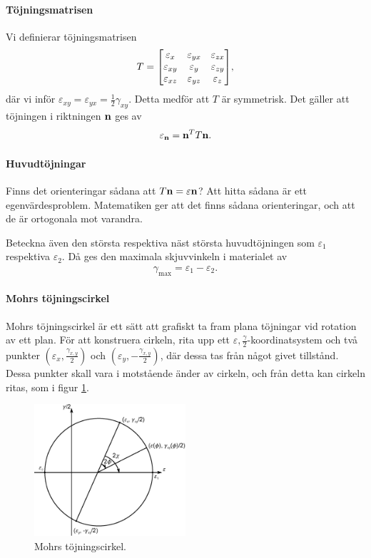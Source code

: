 \paragraph{Töjningsmatrisen}
Vi definierar töjningsmatrisen
\begin{align*}
	T =
	\mqty[
		\varepsilon_{x}  & \varepsilon_{yx} & \varepsilon_{zx} \\
		\varepsilon_{xy} & \varepsilon_{y}  & \varepsilon_{zy} \\
		\varepsilon_{xz} & \varepsilon_{yz} & \varepsilon_{z}
	],
\end{align*}
där vi inför $\varepsilon_{xy} = \varepsilon_{yx} = \frac{1}{2}\gamma_{xy}$. Detta medför att $T$ är symmetrisk. Det gäller att töjningen i riktningen $\vb{n}$ ges av
\begin{align*}
	\varepsilon_{\vb{n}} = \vb{n}^{T}T\vb{n}.
\end{align*}

\paragraph{Huvudtöjningar}
Finns det orienteringar sådana att $T\vb{n} = \varepsilon\vb{n}$? Att hitta sådana är ett egenvärdesproblem. Matematiken ger att det finns sådana orienteringar, och att de är ortogonala mot varandra.

Beteckna även den största respektiva näst största huvudtöjningen som $\varepsilon_{1}$ respektiva $\varepsilon_{2}$. Då ges den maximala skjuvvinkeln i materialet av
\begin{align*}
	\gamma_{\text{max}} = \varepsilon_{1} - \varepsilon_{2}.
\end{align*}

\paragraph{Mohrs töjningscirkel}
Mohrs töjningscirkel är ett sätt att grafiskt ta fram plana töjningar vid rotation av ett plan. För att konstruera cirkeln, rita upp ett $\varepsilon, \frac{\gamma}{2}$-koordinatsystem och två punkter $(\varepsilon_{x}, \frac{\gamma_{x, y}}{2})$ och $(\varepsilon_{y}, -\frac{\gamma_{x, y}}{2})$, där dessa tas från något givet tillstånd. Dessa punkter skall vara i motstående änder av cirkeln, och från detta kan cirkeln ritas, som i figur \ref{fig:mohr_strain_circle}.

\begin{figure}[!ht]
	\centering
	\includegraphics[width = 0.5\textwidth]{./Images/mohr_strain_circle.eps}
	\caption{Mohrs töjningscirkel.}
	\label{fig:mohr_strain_circle}
\end{figure}

